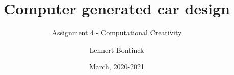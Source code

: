 \title{Computer generated car design}
\subtitle{Assignment 4 - Computational Creativity}
\author{Lennert Bontinck}
\date{March, 2020-2021}
